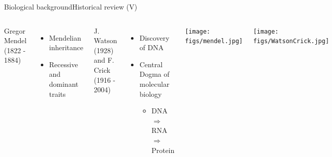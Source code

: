 \documentclass[10pt,compress]{beamer} %
\begin{document}
\begin{frame}{Biological background}{Historical review (V)}
 	\begin{columns}
		Gregor Mendel (1822 - 1884)
		\begin{itemize}
		\item Mendelian inheritance
		\item Recessive and dominant traits
		\end{itemize}


		\bigskip

		
		J. Watson (1928) and F. Crick (1916 - 2004)
 	 	\begin{itemize}
		\item Discovery of DNA
		\item Central Dogma of molecular biology
 	 	    \begin{itemize}
			\item DNA $\Rightarrow$ RNA $\Rightarrow$ Protein
 	  	    \end{itemize}
		\end{itemize}

		\centering\texttt{[image: figs/mendel.jpg]}

		\bigskip

		\centering\texttt{[image: figs/WatsonCrick.jpg]}
	\end{columns}
\end{frame}
\end{document}

